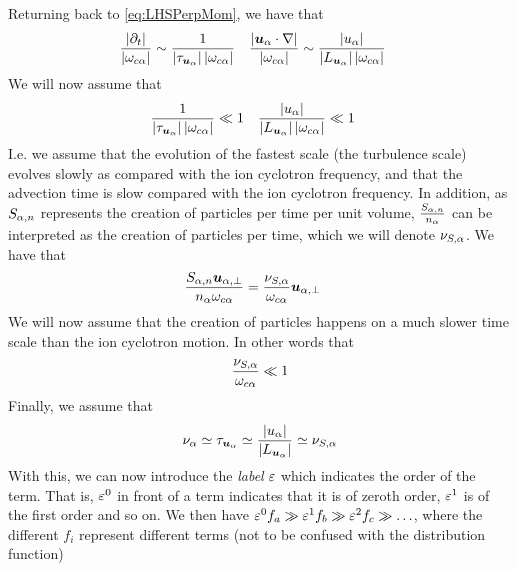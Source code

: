 %
Returning back to \cref{eq:LHSPerpMom}, we have that
%
\begin{align*}
 &\frac{\L|\partial_t\R|}{\L|\om_{c\a}\R|}  \sim
 \frac{1}{\L|\tau_{\ve{u}_\a}\R|\L|\om_{c\a}\R|}&
%
 &\frac{\L|\ve{u}_{\a}\cdot\nabla\R|}{\L|\om_{c\a}\R|} \sim
 \frac{\L|u_{\a}\R|}{\L|L_{\ve{u}_\a}\R|\L|\om_{c\a}\R|}
\end{align*}
%
We will now assume that
%
\begin{align*}
 &\frac{1}{\L|\tau_{\ve{u}_\a}\R|\L|\om_{c\a}\R|} \ll 1&
%
 &\frac{\L|u_{\a}\R|}{\L|L_{\ve{u}_\a}\R|\L|\om_{c\a}\R|} \ll 1
\end{align*}
%
I.e. we assume that the evolution of the fastest scale (the turbulence scale) evolves slowly as compared with the ion cyclotron frequency, and that the advection time is slow compared with the ion cyclotron frequency.
In addition, as $S_{\alpha,n}$ represents the creation of particles per time per unit volume, $\frac{S_{\alpha,n}}{n_\alpha}$ can be interpreted as the creation of particles per time, which we will denote $\nu_{S,\alpha}$.
We have that
%
\begin{align*}
 \frac{
     S_{\alpha,n}\boldsymbol{u}_{\alpha,\perp}
 }{n_\alpha \omega_{c\alpha}}
 &=
 \frac{
     \nu_{S,\alpha}
 }{ \omega_{c\alpha}}
\boldsymbol{u}_{\alpha,\perp}
\end{align*}
%
We will now assume that the creation of particles happens on a much slower time  scale than the ion cyclotron motion.
In other words that
%
\begin{align*}
 \frac{
     \nu_{S,\alpha}
 }{ \omega_{c\alpha}}
 \ll
 1
\end{align*}
%
Finally, we assume that
%
\begin{align*}
 \nu_\alpha \simeq
 \tau_{\boldsymbol{u}_\alpha} \simeq
 \frac{\left|u_{\alpha}\right|}{\left|L_{\boldsymbol{u}_\alpha}\right|}\simeq
 \nu_{S,\alpha}
\end{align*}
%
With this, we can now introduce the \emph{label} $\varepsilon$ which indicates the order of the term.
That is, $\varepsilon^0$ in front of a term indicates that it is of zeroth order, $\varepsilon^1$ is of the first order and so on.
We then have $\varepsilon^0 f_a \gg \varepsilon^1 f_b \gg \varepsilon^2 f_c \gg \ldots$, where the different $f_i$ represent different terms (not to be confused with the distribution function)

